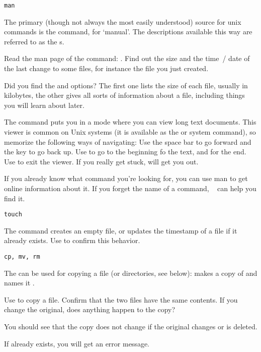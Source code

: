  {\texttt{man}}

The primary (though not always the most easily understood) source for unix commands
is the  command, for `manual'.
The descriptions available this way are referred to as the s.

\begin{exercise}
  Read the man page of the  command:
  .
  Find out the size and the time~/ date of the last change
  to some files, for instance the file you just created.
\end{exercise}
\begin{outcome}
  Did you find the  and  options? The first one
  lists the size of each file, usually in kilobytes, the other gives
  all sorts of information about a file, including things you will
  learn about later.
\end{outcome}

The  command
    puts you in a mode where you can view long text documents. This
    viewer is common on Unix systems (it is available as the  or
     system command), so memorize the following ways of navigating: Use
    the space bar to go forward and the  key to go back up. Use
     to go to the beginning fo the text, and  for the end. Use
     to exit the viewer. If you really get stuck,  will
    get you out.

\begin{remark}
  If you already know what command you're looking for, you can use man
  to get online information about it. If you forget the name of a
  command, ~ can help you find it.
\end{remark}

 {\texttt{touch}}

The  command creates an empty file, or updates the timestamp of
a file if it already exists. Use  to confirm this behavior.

 {\texttt{cp, mv, rm}}

The  can be used for copying a file (or directories,
see below):  makes a copy of  and names it
.

\begin{exercise}
  Use  to copy a file. Confirm that the two files
  have the same contents. If you change the original, does anything
  happen to the copy?
\end{exercise}
\begin{outcome}
  You should see that the copy does not change if the original changes
  or is deleted.
\end{outcome}
\begin{caution}
  If  already exists, you
  will get an error message.
\end{caution}

